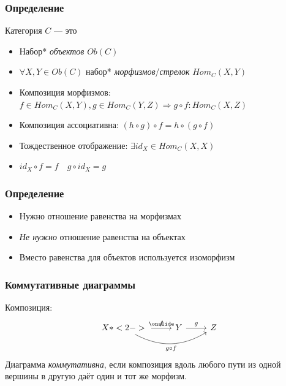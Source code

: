 \documentclass{beamer}
\begin{document}
\begin{frame}
\frametitle{Определение}
\begin{block}{Категория \begin{math}C\end{math} --- это}
\begin{itemize}
\pause
\item Набор* \textit{объектов} \begin{math}Ob(C)\end{math}
\pause
\item \begin{math}\forall X,Y \in Ob(C) \end{math} набор* \textit{морфизмов}/\textit{стрелок} \begin{math}Hom_C(X,Y)\end{math}
\pause
\item Композиция морфизмов: \begin{math}f\in Hom_C(X,Y), g \in Hom_C(Y,Z) \Rightarrow g\circ f:Hom_C(X,Z)\end{math}
\end{itemize}
\end{block}
\pause
\begin{itemize}
\item Композиция ассоциативна: \begin{math}(h\circ g)\circ f = h\circ (g\circ f)\end{math}
\pause
\item Тождественное отображение: \begin{math}\exists id_X\in Hom_C(X,X)\end{math}
\item \begin{math}id_X \circ f = f \quad g \circ id_X = g\end{math}
\end{itemize}
\end{frame}

\begin{frame}
\frametitle{Определение}
\begin{itemize}
\item Нужно отношение равенства на морфизмах
\item \textit{Не нужно} отношение равенства на объектах
\pause
\item Вместо равенства для объектов используется изоморфизм
\end{itemize}
\end{frame}

\begin{frame}[fragile]
\frametitle{Коммутативные диаграммы}
Композиция:
\begin{equation}
\begin{tikzcd}
X \arrow{r}{f} \onslide*<2->{\arrow[bend right]{rr}[swap]{g\circ f}} & Y \arrow{r}{g} & Z
\end{tikzcd}
\end{equation}
\pause
Диаграмма \textit{коммутативна}, если композиция вдоль любого пути из одной вершины в другую даёт один и тот же морфизм.
\end{frame}
\end{document}
